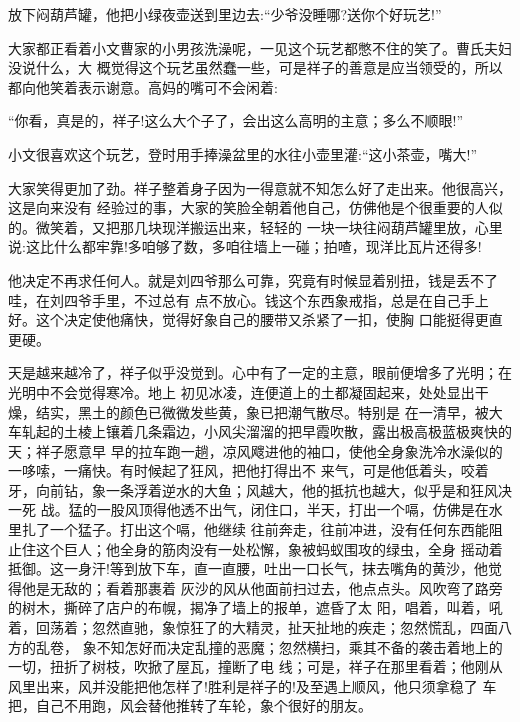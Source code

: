 \documentclass[11pt,a4paper,onecolumn]{article}
\begin{document}
放下闷葫芦罐，他把小绿夜壶送到里边去:``少爷没睡哪?送你个好玩艺!''

大家都正看着小文\myrule 曹家的小男孩\myrule 洗澡呢，一见这个玩艺都憋不住的笑了。曹氏夫妇没说什么，大
概觉得这个玩艺虽然蠢一些，可是祥子的善意是应当领受的，所以都向他笑着表示谢意。高妈的嘴可不会闲着:

``你看，真是的，祥子!这么大个子了，会出这么高明的主意；多么不顺眼!''

小文很喜欢这个玩艺，登时用手捧澡盆里的水往小壶里灌:``这小茶壶，嘴大!''

大家笑得更加了劲。祥子整着身子\myrule 因为一得意就不知怎么好了\myrule 走出来。他很高兴，这是向来没有
经验过的事，大家的笑脸全朝着他自己，仿佛他是个很重要的人似的。微笑着，又把那几块现洋搬运出来，轻轻的
一块一块往闷葫芦罐里放，心里说:这比什么都牢靠!多咱够了数，多咱往墙上一碰；拍喳，现洋比瓦片还得多!

他决定不再求任何人。就是刘四爷那么可靠，究竟有时候显着别扭，钱是丢不了哇，在刘四爷手里，不过总有
点不放心。钱这个东西象戒指，总是在自己手上好。这个决定使他痛快，觉得好象自己的腰带又杀紧了一扣，使胸
口能挺得更直更硬。

天是越来越冷了，祥子似乎没觉到。心中有了一定的主意，眼前便增多了光明；在光明中不会觉得寒冷。地上
初见冰凌，连便道上的土都凝固起来，处处显出干燥，结实，黑土的颜色已微微发些黄，象已把潮气散尽。特别是
在一清早，被大车轧起的土棱上镶着几条霜边，小风尖溜溜的把早霞吹散，露出极高极蓝极爽快的天；祥子愿意早
早的拉车跑一趟，凉风飕进他的袖口，使他全身象洗冷水澡似的一哆嗦，一痛快。有时候起了狂风，把他打得出不
来气，可是他低着头，咬着牙，向前钻，象一条浮着逆水的大鱼；风越大，他的抵抗也越大，似乎是和狂风决一死
战。猛的一股风顶得他透不出气，闭住口，半天，打出一个嗝，仿佛是在水里扎了一个猛子。打出这个嗝，他继续
往前奔走，往前冲进，没有任何东西能阻止住这个巨人；他全身的筋肉没有一处松懈，象被蚂蚁围攻的绿虫，全身
摇动着抵御。这一身汗!等到放下车，直一直腰，吐出一口长气，抹去嘴角的黄沙，他觉得他是无敌的；看着那裹着
灰沙的风从他面前扫过去，他点点头。风吹弯了路旁的树木，撕碎了店户的布幌，揭净了墙上的报单，遮昏了太
阳，唱着，叫着，吼着，回荡着；忽然直驰，象惊狂了的大精灵，扯天扯地的疾走；忽然慌乱，四面八方的乱卷，
象不知怎好而决定乱撞的恶魔；忽然横扫，乘其不备的袭击着地上的一切，扭折了树枝，吹掀了屋瓦，撞断了电
线；可是，祥子在那里看着；他刚从风里出来，风并没能把他怎样了!胜利是祥子的!及至遇上顺风，他只须拿稳了
车把，自己不用跑，风会替他推转了车轮，象个很好的朋友。
\end{document}
